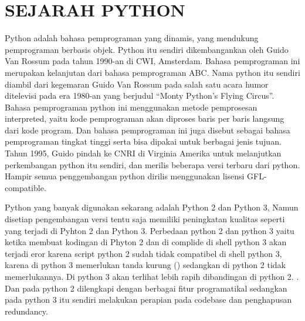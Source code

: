 \chapter*{SEJARAH PYTHON}

\par
	Python adalah bahasa pemprograman yang dinamis, yang mendukung pemprograman berbasis objek. Python itu sendiri dikembangankan oleh Guido Van Rossum pada tahun 1990-an di CWI, Amsterdam. Bahasa pemprograman ini merupakan kelanjutan dari bahasa pemprograman ABC. Nama python itu sendiri diambil dari kegemaran Guido Van Rossum pada salah satu acara humor ditelevisi pada era 1980-an yang berjudul “Monty Python’s Flying Circus”. Bahasa pemprograman python ini menggunakan metode pemprosesan interpreted, yaitu kode pemprograman akan diproses baris per baris langsung dari kode program. Dan bahasa pemprograman ini juga disebut sebagai bahasa pemprograman tingkat tinggi serta bisa dipakai untuk berbagai jenis tujuan. Tahun 1995, Guido pindah ke CNRI di Virginia Amerika untuk melanjutkan perkembangan python itu sendiri, dan merilis beberapa versi terbaru dari python. Hampir semua penggembangan python dirilis menggunakan lisensi GFL-compatible.

\par
	Python yang banyak digunakan sekarang adalah Python 2 dan Python 3, Namun disetiap pengembangan versi tentu saja memiliki peningkatan kualitas seperti yang terjadi di Pyhton 2 dan Python 3. Perbedaan python 2 dan python 3 yaitu ketika membuat kodingan di Phyton 2 dan di complide di shell python 3 akan terjadi eror karena script python 2 sudah tidak compatibel di shell python 3, karena di python 3 memerlukan tanda kurung () sedangkan di python 2 tidak memerlukannya. Di python 3 akan terlihat lebih rapih dibandingan di python 2. . Dan pada python 2 dilengkapi dengan berbagai fitur programatikal sedangkan pada python 3 itu sendiri melakukan perapian pada codebase dan penghapusan redundancy.